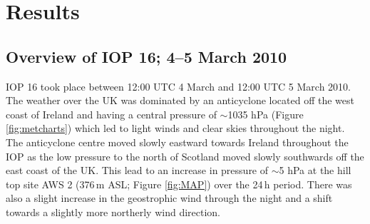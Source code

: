 \documentclass[times]{qjrms4}
\begin{document}
\section{Results}
\subsection{Overview of IOP 16; 4--5 March 2010}
IOP 16 took place between 12:00 UTC 4 March and 12:00 UTC 5 March 2010. The weather over the UK was dominated by an anticyclone located off the west coast of Ireland and having a central pressure of $\sim$1035 hPa (Figure \ref{fig:metcharts}) which led to light winds and clear skies throughout the night. The anticyclone centre moved slowly eastward towards Ireland throughout the IOP as the low pressure to the north of Scotland moved slowly southwards off the east coast of the UK. This lead to an increase in pressure of $\sim$5 hPa at the hill top site AWS 2 (376$\,\mbox{m}$ ASL; Figure \ref{fig:MAP}) over the 24$\,\mbox{h}$ period. There was also a slight increase in the geostrophic wind through the night and a shift towards a slightly more northerly wind direction.
\end{document}
